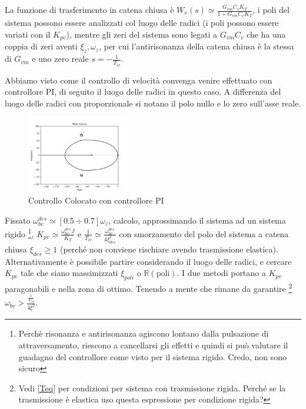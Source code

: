 La funzione di trasferimento in catena chiusa è \(W_v(s) \simeq \frac{G_{vm}C_v K_T}{1+G_{vm}C_v K_T}\), i poli del sistema possono essere analizzati col luogo delle radici (i poli possono essere variati con il \(K_{pv}\)), mentre gli zeri del sistema sono legati a \(G_{vm}C_v\) che ha una coppia di zeri aventi \(\xi_z, \omega_z\), per cui l'antirisonanza della catena chiusa è la stessa di \(G_{vm}\) e uno zero reale \(s=-\frac{1}{T_{iv}}\).

Abbiamo visto come il controllo di velocità convenga venire effettuato con controllore PI, di seguito il luogo delle radici in questo caso. A differenza del luogo delle radici con proporzionale si notano il polo nullo e lo zero sull'asse reale.

\begin{figure}[h]
    \centering
    \includegraphics[width=0.4\textwidth]{Immagini/controllo_v_colocato_PI.png}
    \caption{Controllo Colocato con controllore PI}
\end{figure}

Fissato \(\omega_{bv}^{des} \simeq [0.5\div 0.7]\omega_z\), calcolo, approssimando il sistema ad un sistema rigido \footnote{Perchè risonanza e antirisonanza agiscono lontano dalla pulsazione di attraversamento, riescono a cancellarsi gli effetti e quindi si può valutare il guadagno del controllore come visto per il sistema rigido. {\color{red}Credo, non sono sicuro}}, \(K_{pv} \simeq \frac{\omega_{bv}^{des} J}{K_T}\) e \(\frac{1}{T_{iv}} \simeq \frac{\omega_{bv}^{des}}{4 \xi_{des}^2}\) con smorzamento del polo del sistema a catena chiusa \(\xi_{des} \geqslant 1\) (perché non conviene rischiare avendo trasmissione elastica).
Alternativamente è possibile partire considerando il luogo delle radici, e cercare \(K_{pv}\) tale che siano massimizzati \(\xi_{poli}\) o \(\mathbb{R}(\text{poli})\).
I due metodi portano a \(K_{pv}\) paragonabili e nella zona di ottimo.
Tenendo a mente che rimane da garantire \footnote{Vedi \ref{Teq} per condizioni per sistema con trasmissione rigida. {\color{red}Perché se la trasmissione è elastica uso questa espressione per condizione rigida?}} \(\omega_{bv} > \frac{\frac{1}{T_{eq}}}{4\xi^2}\).

